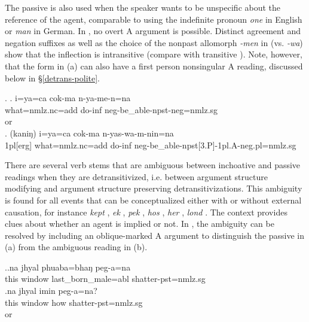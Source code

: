 The passive is also used when the speaker wants to be unspecific about the reference of the agent, comparable to using the indefinite pronoun \emph{one} in English or \emph{man} in German. In  \Next[a], no overt A argument is possible. Distinct agreement and negation suffixes as well as the choice of the nonpast allomorph \emph{-men} in \Next[a] (vs.  \emph{-wa}) show that the inflection is intransitive (compare with transitive \Next[b]). Note, however, that the form in (a) can also have a first person nonsingular A reading, discussed below in §\ref{detrans-polite}.

\ex. \ag. i=ya=ca cok-ma n-ya-me-n=na\\
what{\sc =nmlz.nc=add} do{\sc -inf} {\sc neg-}be\_able{\sc [3sg]-npst-neg=nmlz.sg}\\
 or\\
\bg. (kaniŋ) i=ya=ca cok-ma n-yas-wa-m-nin=na \\
{\sc 1pl[erg]} what{\sc =nmlz.nc=add} do{\sc -inf} {\sc neg-}be\_able{\sc -npst[3.P]-1pl.A-neg.pl=nmlz.sg}\\ 


There are several verb stems that are ambiguous between inchoative and passive readings when they are detransitivized, i.e. between argument structure modifying and argument structure preserving detransitivizations. This ambiguity is found for all events that can be conceptualized either with or without external causation, for instance \emph{kept} , \emph{ek} ,  \emph{pek} , \emph{hos} , \emph{her} , \emph{lond} . The context provides clues about whether an agent is implied or not. In \Next, the ambiguity can be resolved by including an oblique-marked A argument to distinguish the passive in (a) from the ambiguous reading in (b). 

\ex.\ag.na jhyal phuaba=bhaŋ peg-a=na\\
this window  last\_born\_male{\sc =abl}  shatter{\sc [3sg]-pst=nmlz.sg}\\
\bg.na jhyal imin peg-a=na?\\
this window how shatter{\sc [3sg]-pst=nmlz.sg}\\
 or \\

